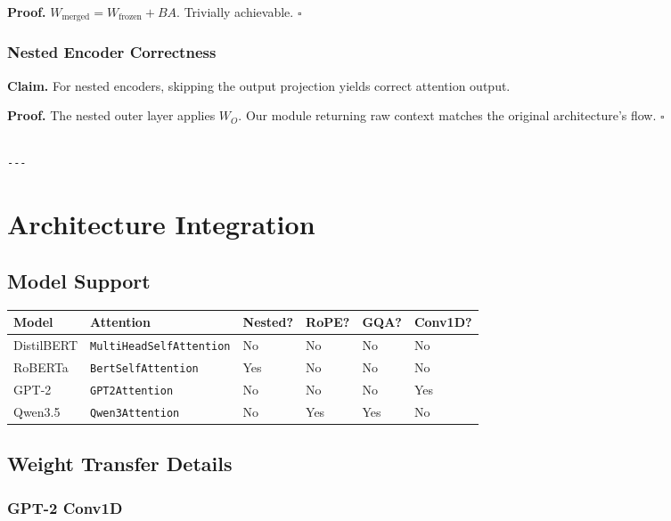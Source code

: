 \textbf{Proof.} $W_\text{merged} = W_\text{frozen} + BA$. Trivially achievable. $\square$

\subsubsection{Nested Encoder Correctness}

\textbf{Claim.} For nested encoders, skipping the output projection yields 
correct attention output.

\textbf{Proof.} The nested outer layer applies $W_O$. Our module returning raw 
context matches the original architecture's flow. $\square$
\begin{lstlisting}

---
\end{lstlisting}

\section{Architecture Integration}

\subsection{Model Support}

\begin{table}[H]
\centering
\small
\begin{tabular}{llllll}
\toprule
\textbf{Model} & \textbf{Attention} & \textbf{Nested?} & \textbf{RoPE?} & \textbf{GQA?} & \textbf{Conv1D?} \\
\midrule
DistilBERT & \texttt{MultiHeadSelfAttention} & No & No & No & No \\
RoBERTa & \texttt{BertSelfAttention} & Yes & No & No & No \\
GPT-2 & \texttt{GPT2Attention} & No & No & No & Yes \\
Qwen3.5 & \texttt{Qwen3Attention} & No & Yes & Yes & No \\
\bottomrule
\end{tabular}
\end{table}

\subsection{Weight Transfer Details}

\subsubsection{GPT-2 Conv1D}

